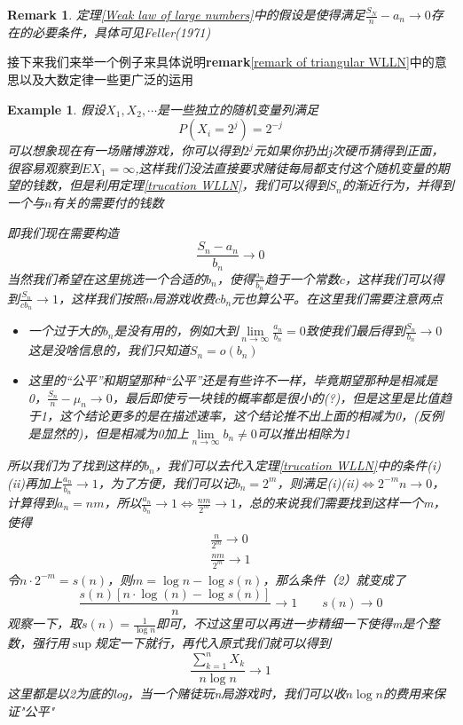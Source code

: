\documentclass{article}
\newtheorem{example}{Example}[section]
\newtheorem{remark}{Remark}[theorem]
\begin{document}
\begin{remark}
	定理\ref{Weak law of large numbers}中的假设是使得满足$\frac{S_N}{n}-a_n\to 0$存在的必要条件，具体可见Feller(1971)
\end{remark}
接下来我们来举一个例子来具体说明\textbf{remark}\ref{remark of triangular WLLN}中的意思以及大数定律一些更广泛的运用
\begin{example}
	假设$X_1,X_2,\cdots$是一些独立的随机变量列满足
	\begin{equation*}
		P(X_i=2^j)=2^{-j}
	\end{equation*}
可以想象现在有一场赌博游戏，你可以得到$2^j$元如果你扔出j次硬币猜得到正面，很容易观察到$EX_1=\infty$,这样我们没法直接要求赌徒每局都支付这个随机变量的期望的钱数，但是利用定理\ref{trucation WLLN}，我们可以得到$S_n$的渐近行为，并得到一个与$n$有关的需要付的钱数
\par 即我们现在需要构造
\begin{equation*}
	\frac{S_n-a_n}{b_n}\to 0
\end{equation*}
当然我们希望在这里挑选一个合适的$b_n$，使得$\frac{a_n}{b_n}$趋于一个常数$c$，这样我们可以得到$\frac{S_n}{cb_n}\to 1$，这样我们按照$n$局游戏收费$cb_n$元也算公平。在这里我们需要注意两点
\begin{itemize}
	\item 一个过于大的$b_n$是没有用的，例如大到$\lim\limits_{n\to\infty}\frac{a_n}{b_n}=0$致使我们最后得到$\frac{S_n}{b_n}\to 0$这是没啥信息的，我们只知道$S_n=o(b_n)$
	\item 这里的“公平”和期望那种“公平”还是有些许不一样，毕竟期望那种是相减是0，$\frac{S_n}{n}-\mu_n\to 0$，最后即使亏一块钱的概率都是很小的(?)，但是这里是比值趋于1，这个结论更多的是在描述速率，这个结论推不出上面的相减为0，(反例是显然的)，但是相减为0加上$\lim\limits_{n\to \infty}b_n\ne0$可以推出相除为1
\end{itemize}
所以我们为了找到这样的$b_n$，我们可以去代入定理\ref{trucation WLLN}中的条件(i)(ii)再加上$\frac{a_n}{b_n}\to 1$，为了方便，我们可以记$b_n=2^m$，则满足(i)(ii)$\Leftrightarrow2^{-m}n\to 0$，计算得到$a_n=nm$，所以$\frac{a_n}{b_n}\to 1\Leftrightarrow \frac{nm}{2^m}\to 1$，总的来说我们需要找到这样一个m，使得
\begin{align}
	\frac{n}{2^m}\to 0 \\
	\frac{nm}{2^m}\to 1
\end{align}
令$n \cdot 2^{-m} =s(n)$，则$m=\log n-\log s(n)$，那么条件（2）就变成了
\begin{equation*}
	\frac{s(n)[n \cdot \log (n)-\log s(n)]}{n}\to 1\quad\quad s(n)\to 0
\end{equation*}
观察一下，取$s(n)=\frac{1}{\log n}$即可，不过这里可以再进一步精细一下使得m是个整数，强行用$\sup$规定一下就行，再代入原式我们就可以得到
\begin{equation*}
	\frac{\sum_{k=1}^nX_k}{n\log n}\to 1
\end{equation*}
这里都是以2为底的log，当一个赌徒玩n局游戏时，我们可以收$n\log n$的费用来保证"公平"
\end{example}
\end{document}
